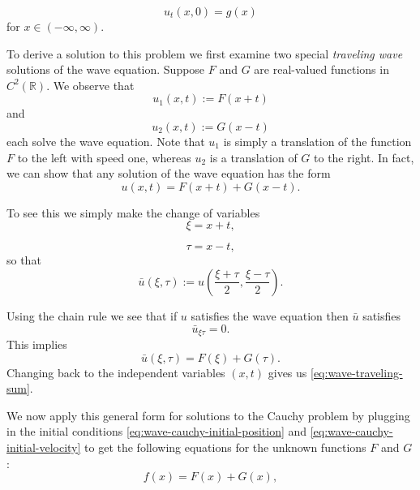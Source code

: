 \begin{equation}\label{eq:wave-cauchy-initial-velocity}
u_t(x,0)=g(x)
\end{equation}
for $x\in(-\infty,\infty)$.

To derive a solution to this problem we first examine two special \emph{traveling wave} solutions of the wave equation. Suppose $F$ and $G$ are real-valued functions in $C^2(\mathbb{R})$. We observe that
\begin{equation}\label{eq:left-traveling-wave}
u_1(x,t):=F(x+t)
\end{equation}
and
\begin{equation}\label{eq:right-traveling-wave}
u_2(x,t):=G(x-t)
\end{equation}
each solve the wave equation. Note that $u_1$ is simply a translation of the function $F$ to the left with speed one, whereas $u_2$ is a translation of $G$ to the right. In fact, we can show that any solution of the wave equation has the form
\begin{equation}\label{eq:wave-traveling-sum}
u(x,t)=F(x+t)+G(x-t).
\end{equation}


To see this we simply make the change of variables
\begin{equation}\label{eq:wave-characteristic-xi}
\xi=x+t,
\end{equation}

\begin{equation}\label{eq:wave-characteristic-tau}
\tau=x-t,
\end{equation}
so that
\begin{equation}\label{eq:wave-transformed-function}
\bar u(\xi,\tau):=u\left(\dfrac{\xi+\tau}{2},\dfrac{\xi-\tau}{2}\right).
\end{equation}


Using the chain rule we see that if $u$ satisfies the wave equation then $\bar u$ satisfies
\begin{equation}\label{eq:wave-mixed-derivative-zero}
\bar u_{\xi\tau}=0.
\end{equation}
This implies
\begin{equation}\label{eq:wave-characteristic-split}
\bar u(\xi,\tau)=F(\xi)+G(\tau).
\end{equation}
Changing back to the independent variables $(x,t)$ gives us \eqref{eq:wave-traveling-sum}.

We now apply this general form for solutions to the Cauchy problem by plugging in the initial conditions \eqref{eq:wave-cauchy-initial-position} and \eqref{eq:wave-cauchy-initial-velocity} to get the following equations for the unknown functions $F$ and $G$:
\begin{equation}\label{eq:dalembert-initial-position-relation}
f(x)=F(x)+G(x),
\end{equation}

